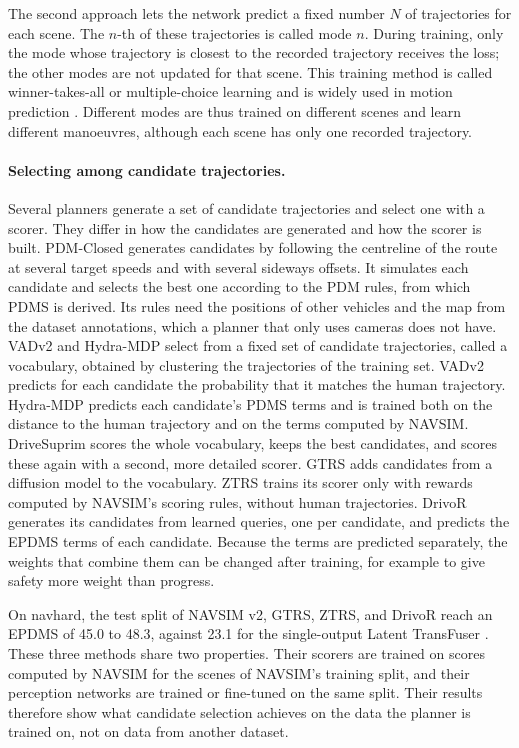 \documentclass[11pt, a4paper, oneside]{book}
\begin{document}
The second approach lets the network predict a fixed number $N$ of trajectories for each scene.
The $n$-th of these trajectories is called mode $n$. During training, only the mode whose
trajectory is closest to the recorded trajectory receives the loss; the other modes are not
updated for that scene. This training method is called winner-takes-all or multiple-choice
learning \cite{mcl} and is widely used in motion prediction \cite{multipath}. Different modes are
thus trained on different scenes and learn different manoeuvres, although each scene has only
one recorded trajectory.

\paragraph{Selecting among candidate trajectories.}
Several planners generate a set of candidate trajectories and select one with a scorer. They
differ in how the candidates are generated and how the scorer is built. PDM-Closed \cite{pdm}
generates candidates by following the centreline of the route at several target speeds and
with several sideways offsets. It simulates each candidate and selects the best one according to
the PDM rules, from which PDMS is derived. Its rules need the positions of other vehicles and the map from the dataset annotations,
which a planner that only uses cameras does not have. VADv2 \cite{vadv2} and Hydra-MDP
\cite{hydramdp} select from a fixed set of candidate trajectories, called a vocabulary, obtained
by clustering the trajectories of the training set. VADv2 predicts for each candidate the
probability that it matches the human trajectory. Hydra-MDP predicts each candidate's PDMS terms
and is trained both on the distance to the human trajectory and on the terms computed by NAVSIM.
DriveSuprim \cite{drivesuprim} scores the whole vocabulary, keeps the best candidates, and scores
these again with a second, more detailed scorer. GTRS \cite{gtrs} adds candidates from a
diffusion model to the vocabulary. ZTRS \cite{ztrs} trains its scorer only with rewards computed
by NAVSIM's scoring rules, without human trajectories. DrivoR \cite{drivor} generates its candidates from learned
queries, one per candidate, and predicts the EPDMS terms of each candidate. Because the terms
are predicted separately, the weights that combine them can be changed after training, for
example to give safety more weight than progress.

On navhard, the test split of NAVSIM v2, GTRS, ZTRS, and DrivoR reach an EPDMS of 45.0 to 48.3,
against 23.1 for the single-output Latent TransFuser \cite{pseudosim,drivor}. These three methods
share two properties. Their scorers are trained on scores computed by NAVSIM for the scenes of
NAVSIM's training split, and their perception networks are trained or fine-tuned on the same
split. Their results therefore show
what candidate selection achieves on the data the planner is trained on, not on data from
another dataset.
\end{document}
